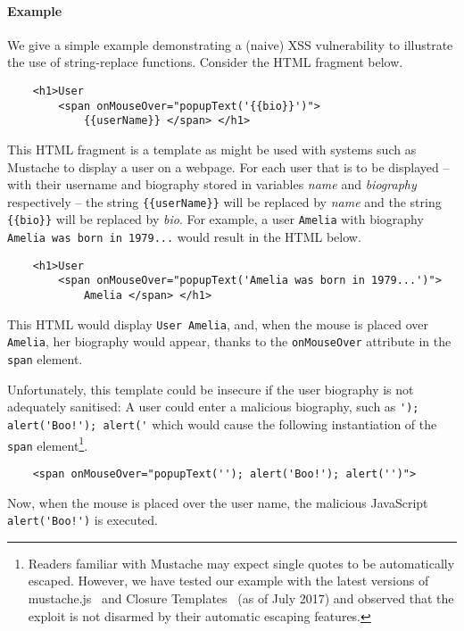 
\paragraph{Example}

We give a simple example demonstrating a (naive) XSS vulnerability to illustrate the use of string-replace functions.
Consider the HTML fragment below.
\begin{verbatim}
    <h1>User 
        <span onMouseOver="popupText('{{bio}}')">
            {{userName}} </span> </h1>
\end{verbatim}
This HTML fragment is a template as might be used with systems such as Mustache to display a user on a webpage.
For each user that is to be displayed -- with their username and biography stored in variables \emph{name} and \emph{biography} respectively -- the string \verb+{{userName}}+ will be replaced by \emph{name} and the string \verb+{{bio}}+ will be replaced by \emph{bio}.
For example, a user \verb+Amelia+ with biography \verb+Amelia was born in 1979...+ would result in the HTML below.
\begin{verbatim}
    <h1>User 
        <span onMouseOver="popupText('Amelia was born in 1979...')">
            Amelia </span> </h1>
\end{verbatim}
This HTML would display \verb+User Amelia+, and, when the mouse is placed over \verb+Amelia+, her biography would appear, thanks to the \verb+onMouseOver+ attribute in the \verb+span+ element.

Unfortunately, this template could be insecure if the user biography is not adequately sanitised: 
A user could enter a malicious biography, such as \verb+'); alert('Boo!'); alert('+ which would cause the following instantiation of the \verb+span+ element\footnote{
    Readers familiar with Mustache may expect single quotes to be automatically escaped.
    However, we have tested our example with the latest versions of mustache.js~\cite{MustacheJS} and Closure Templates~\cite{Closure} (as of July 2017) and observed that the exploit is not disarmed by their automatic escaping features.
}.
\begin{verbatim}
    <span onMouseOver="popupText(''); alert('Boo!'); alert('')">
\end{verbatim}
Now, when the mouse is placed over the user name, the malicious JavaScript \verb+alert('Boo!')+ is executed.

